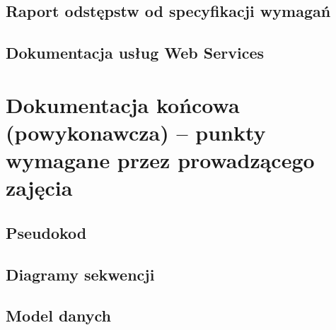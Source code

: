 \documentclass[10pt,a4paper]{article}
\begin{document}
\subsection{Raport odstępstw od specyfikacji wymagań}

\subsection{Dokumentacja usług Web Services}
%

\section{Dokumentacja końcowa (powykonawcza) -- punkty wymagane przez prowadzącego zajęcia}

\subsection{Pseudokod}

\subsection{Diagramy sekwencji}
%

\subsection{Model danych}
\end{document}
